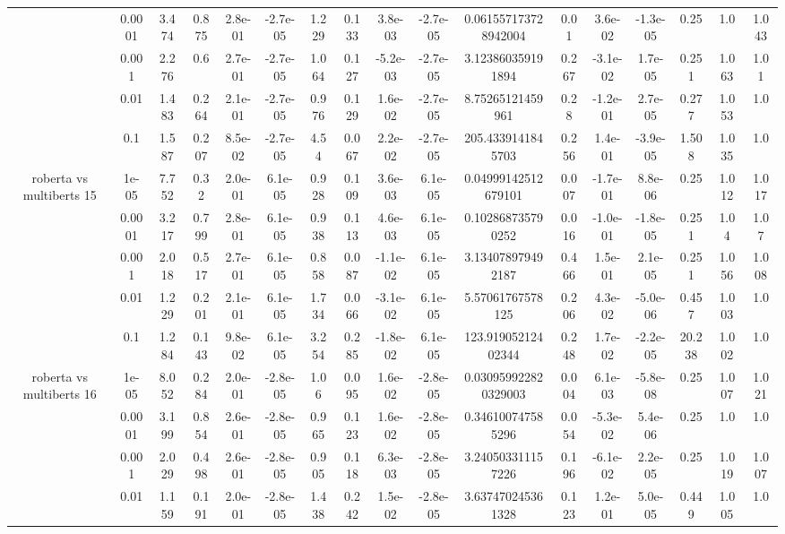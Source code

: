 \begin{tabular}{|c|c|c|c|c|c|c|c|c|c|c|c|c|c|c|c|c|}
 & 0.0001 & 3.474 & 0.875 & 2.8e-01 & -2.7e-05 & 1.229 & 0.133 & 3.8e-03 & -2.7e-05 & 0.061557173728942004 & 0.01 & 3.6e-02 & -1.3e-05 & 0.25 & 1.0 & 1.043 \\
 & 0.001 & 2.276 & 0.6 & 2.7e-01 & -2.7e-05 & 1.064 & 0.127 & -5.2e-03 & -2.7e-05 & 3.123860359191894 & 0.267 & -3.1e-02 & 1.7e-05 & 0.251 & 1.063 & 1.01 \\
 & 0.01 & 1.483 & 0.264 & 2.1e-01 & -2.7e-05 & 0.976 & 0.129 & 1.6e-02 & -2.7e-05 & 8.75265121459961 & 0.28 & -1.2e-01 & 2.7e-05 & 0.277 & 1.053 & 1.0 \\
 & 0.1 & 1.587 & 0.207 & 8.5e-02 & -2.7e-05 & 4.54 & 0.067 & 2.2e-02 & -2.7e-05 & 205.4339141845703 & 0.256 & 1.4e-01 & -3.9e-05 & 1.508 & 1.035 & 1.0 \\
\hline
\multirow{5}{*}{roberta  vs multiberts 15} & 1e-05 & 7.752 & 0.32 & 2.0e-01 & 6.1e-05 & 0.928 & 0.109 & 3.6e-03 & 6.1e-05 & 0.04999142512679101 & 0.007 & -1.7e-01 & 8.8e-06 & 0.25 & 1.012 & 1.017 \\
 & 0.0001 & 3.217 & 0.799 & 2.8e-01 & 6.1e-05 & 0.938 & 0.113 & 4.6e-03 & 6.1e-05 & 0.102868735790252 & 0.016 & -1.0e-01 & -1.8e-05 & 0.251 & 1.04 & 1.07 \\
 & 0.001 & 2.018 & 0.517 & 2.7e-01 & 6.1e-05 & 0.858 & 0.087 & -1.1e-02 & 6.1e-05 & 3.134078979492187 & 0.466 & 1.5e-01 & 2.1e-05 & 0.251 & 1.056 & 1.008 \\
 & 0.01 & 1.229 & 0.201 & 2.1e-01 & 6.1e-05 & 1.734 & 0.066 & -3.1e-02 & 6.1e-05 & 5.57061767578125 & 0.206 & 4.3e-02 & -5.0e-06 & 0.457 & 1.003 & 1.0 \\
 & 0.1 & 1.284 & 0.143 & 9.8e-02 & 6.1e-05 & 3.254 & 0.285 & -1.8e-02 & 6.1e-05 & 123.91905212402344 & 0.248 & 1.7e-02 & -2.2e-05 & 20.238 & 1.002 & 1.0 \\
\hline
\multirow{5}{*}{roberta  vs multiberts 16} & 1e-05 & 8.052 & 0.284 & 2.0e-01 & -2.8e-05 & 1.06 & 0.095 & 1.6e-02 & -2.8e-05 & 0.030959922820329003 & 0.004 & 6.1e-03 & -5.8e-08 & 0.25 & 1.007 & 1.021 \\
 & 0.0001 & 3.199 & 0.854 & 2.6e-01 & -2.8e-05 & 0.965 & 0.123 & 1.6e-02 & -2.8e-05 & 0.346100747585296 & 0.054 & -5.3e-02 & 5.4e-06 & 0.25 & 1.0 & 1.0 \\
 & 0.001 & 2.029 & 0.498 & 2.6e-01 & -2.8e-05 & 0.905 & 0.118 & 6.3e-03 & -2.8e-05 & 3.240503311157226 & 0.196 & -6.1e-02 & 2.2e-05 & 0.25 & 1.019 & 1.007 \\
 & 0.01 & 1.159 & 0.191 & 2.0e-01 & -2.8e-05 & 1.438 & 0.242 & 1.5e-02 & -2.8e-05 & 3.637470245361328 & 0.123 & 1.2e-01 & 5.0e-05 & 0.449 & 1.005 & 1.0 \\

\end{tabular}
